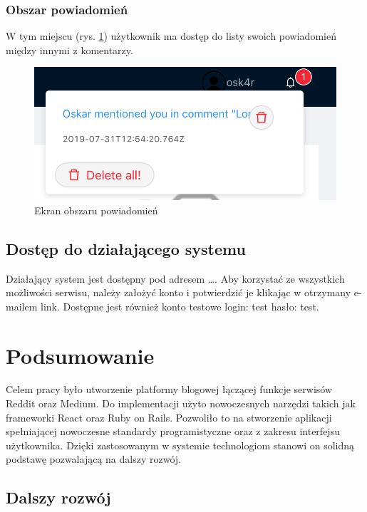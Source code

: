 \documentclass[declaration,shortabstract]{iithesis}
\begin{document}
\subsection{Obszar powiadomień}
W tym miejscu (rys. \ref{fig:notification}) użytkownik ma dostęp do listy swoich powiadomień między innymi z komentarzy.
\begin{figure}
    \centering
    \includegraphics[width=\linewidth]{images/powiadomienia.png}
    \caption{Ekran obszaru powiadomień}
    \label{fig:notification}
\end{figure}

\section{Dostęp do działającego systemu}
Działający system jest dostępny pod adresem \ldots. Aby korzystać ze wszystkich możliwości serwisu, należy założyć konto i potwierdzić je klikając w otrzymany e-mailem link. Dostępne jest również konto testowe login: test hasło: test.

\chapter{Podsumowanie}
Celem pracy było utworzenie platformy blogowej łączącej funkcje serwisów Reddit oraz Medium. Do implementacji użyto nowoczesnych narzędzi takich jak frameworki React oraz Ruby on Rails. Pozwoliło to na stworzenie aplikacji spełniającej nowoczesne standardy programistyczne oraz z zakresu interfejsu użytkownika. Dzięki zastosowanym w systemie technologiom stanowi on solidną podstawę pozwalającą na dalszy rozwój. 

\section{Dalszy rozwój}
\end{document}
